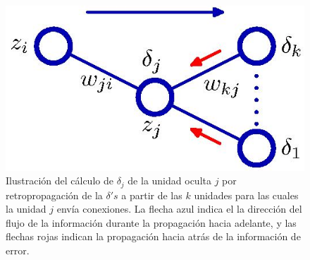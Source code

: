 \documentclass[a4paper,11pt,spanish]{book}
\begin{document}
	\begin{figure}[ht]
	  \begin{center}
	  \includegraphics[width=0.5\linewidth]{./img/bishop_backpropagation.jpg}
	  \end{center}
	  \caption{Ilustración del cálculo de $\delta_j$ de la unidad oculta  $j$ por retropropagación de la $\delta 's$ a partir de las $k$ unidades para las cuales la unidad $j$ envía
	    conexiones. La flecha azul indica el la dirección del flujo de la información durante la propagación hacia adelante, y las flechas rojas indican la propagación
	    hacia atrás de la información de error.}
	  \label{fig:backpropagation}
	\end{figure}
	
\end{document}
